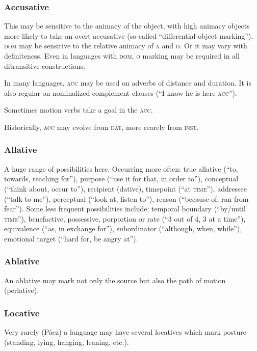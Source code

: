 \documentclass[11pt]{article}
\newcommand{\I}[1]{\textsc{#1}}   %
\begin{document}
\subsubsection{Accusative} This may be sensitive to the animacy of the
object, with high animacy objects more likely to take an overt
accusative (so-called ``differential object marking'').  \I{dom} may
be sensitive to the relative animacy of \I{a} and \I{o}.  Or it may
vary with definiteness.  Even in languages with \I{dom}, \I{o} marking
may be required in all ditransitive constructions.

In many languages, \I{acc} may be used on adverbs of distance and
duration.  It is also regular on nominalized complement clauses (``I
know he-is-here-\I{acc}'').

Sometimes motion verbs take a goal in the \I{acc}.

Historically, \I{acc} may evolve from \I{dat}, more rearely from
\I{inst}. 


\subsubsection{Allative} A huge range of possibilities here.
Occurring more often: true allative (``to, towards, reaching for''),
purpose (``use it for that, in order to''), conceptual (``think about,
occur to''), recipient (dative), timepoint (``at \I{time}''),
addressee (``talk to me''), perceptual (``look at, listen to''),
reason (``because of, ran from fear'').  Some less frequent
possibilities include: temporal boundary (``by/until \I{time}''),
benefactive, possessive, porportion or rate (``3 out of 4, 3 at a
time''), equivalence (``as, in exchange for''), subordinator
(``although, when, while''), emotional target (``hard for, be angry
at'').

\subsubsection{Ablative} An ablative may mark not only the source but
also the path of motion (perlative).

\subsubsection{Locative} Very rarely (Páez) a language may have
several locatives which mark posture (standing, lying, hanging,
leaning, etc.).
\end{document}
